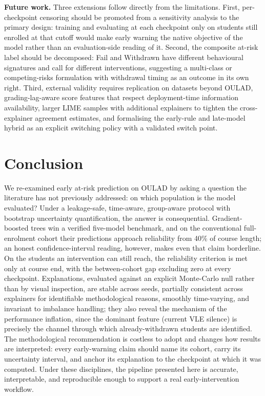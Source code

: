 \documentclass[conference]{IEEEtran}
\begin{document}
\textbf{Future work.}
Three extensions follow directly from the limitations. First, per-checkpoint
censoring should be promoted from a sensitivity analysis to the primary
design: training and evaluating at each checkpoint only on students still
enrolled at that cutoff would make early warning the native objective of the
model rather than an evaluation-side reading of it. Second, the composite
at-risk label should be decomposed: Fail and Withdrawn have different
behavioural signatures and call for different interventions, suggesting a
multi-class or competing-risks formulation with withdrawal timing as an
outcome in its own right. Third, external validity requires replication on
datasets beyond OULAD, grading-lag-aware score features that respect
deployment-time information availability, larger LIME samples with
additional explainers to tighten the cross-explainer agreement estimates,
and formalising the early-rule and late-model hybrid as an explicit
switching policy with a validated switch point.

\section{Conclusion}

We re-examined early at-risk prediction on OULAD by asking a question the
literature has not previously addressed: on which population is the model
evaluated? Under a leakage-safe, time-aware, group-aware protocol with
bootstrap uncertainty quantification, the answer is consequential.
Gradient-boosted trees win a verified five-model benchmark, and on the
conventional full-enrolment cohort their predictions approach reliability
from 40\% of course length; an honest confidence-interval reading, however,
makes even that claim borderline. On the students an intervention can still
reach, the reliability criterion is met only at course end, with the
between-cohort gap excluding zero at every checkpoint. Explanations,
evaluated against an explicit Monte-Carlo null rather than by visual
inspection, are stable across seeds, partially consistent across explainers
for identifiable methodological reasons, smoothly time-varying, and
invariant to imbalance handling; they also reveal the mechanism of the
performance inflation, since the dominant feature (current VLE silence) is
precisely the channel through which already-withdrawn students are
identified. The methodological recommendation is costless to adopt and
changes how results are interpreted: every early-warning claim should name
its cohort, carry its uncertainty interval, and anchor its explanation to
the checkpoint at which it was computed. Under these disciplines, the
pipeline presented here is accurate, interpretable, and reproducible enough
to support a real early-intervention workflow.
\end{document}
